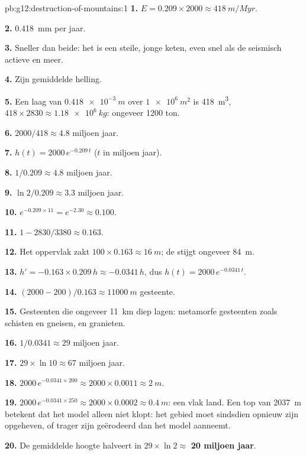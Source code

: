\begin{solution}{pb:g12:destruction-of-mountains:1}
\textbf{1.} $E = 0.209 \times 2000 \approx \qty{418}{m/Myr}$.

\textbf{2.} \qty{0.418}{mm} per jaar.

\textbf{3.} Sneller dan beide: het is een steile, jonge keten, even snel als de
seismisch actieve  en meer.

\textbf{4.} Zijn gemiddelde helling.

\textbf{5.} Een laag van $\qty{0.418e-3}{m}$ over $\qty{1e6}{m^2}$ is
\qty{418}{m^3}, $418 \times 2830 \approx \qty{1.18e6}{kg}$: ongeveer 1200
ton.

\textbf{6.} $2000/418 \approx 4.8$ miljoen jaar.

\textbf{7.} $h(t) = 2000\,e^{-0.209\,t}$ ($t$ in miljoen jaar).

\textbf{8.} $1/0.209 \approx 4.8$ miljoen jaar.

\textbf{9.} $\ln 2/0.209 \approx 3.3$ miljoen jaar.

\textbf{10.} $e^{-0.209 \times 11} = e^{-2.30} \approx 0.100$.

\textbf{11.} $1 - 2830/3380 \approx 0.163$.

\textbf{12.} Het oppervlak zakt $100 \times 0.163 \approx \qty{16}{m}$;
de  stijgt ongeveer \qty{84}{m}.

\textbf{13.} $h' = -0.163 \times 0.209\,h \approx -0.0341\,h$, dus $h(t) =
2000\,e^{-0.0341\,t}$.

\textbf{14.} $(2000 - 200)/0.163 \approx \qty{11000}{m}$ gesteente.

\textbf{15.} Gesteenten die ongeveer \qty{11}{km} diep lagen: metamorfe gesteenten
zoals schisten en gneisen, en granieten.

\textbf{16.} $1/0.0341 \approx 29$ miljoen jaar.

\textbf{17.} $29 \times \ln 10 \approx 67$ miljoen jaar.

\textbf{18.} $2000\,e^{-0.0341 \times 200} \approx 2000 \times 0.0011 \approx
\qty{2}{m}$.

\textbf{19.} $2000\,e^{-0.0341 \times 250} \approx 2000 \times 0.0002 \approx
\qty{0.4}{m}$: een vlak land. Een top van \qty{2037}{m} betekent dat het model
alleen niet klopt: het gebied moet sindsdien opnieuw zijn opgeheven, of
trager zijn geërodeerd dan het model aanneemt.

\textbf{20.} De gemiddelde hoogte halveert in $29 \times \ln 2 \approx$
\textbf{20 miljoen jaar}.
\end{solution}
